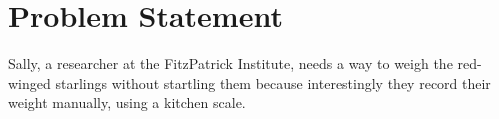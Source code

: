 \documentclass[class=report,11pt,crop=false]{standalone}
\begin{document}
	\chapter{Problem Statement \label{ch:problem}}
	\vspace{0.5cm}
	Sally, a researcher at the FitzPatrick Institute, needs a way to weigh the red-winged starlings without startling them because interestingly they record their weight manually, using a kitchen scale.
	
	\ifstandalone
	
	\printnoidxglossary[type=\acronymtype,nonumberlist]
	\fi
\end{document}
